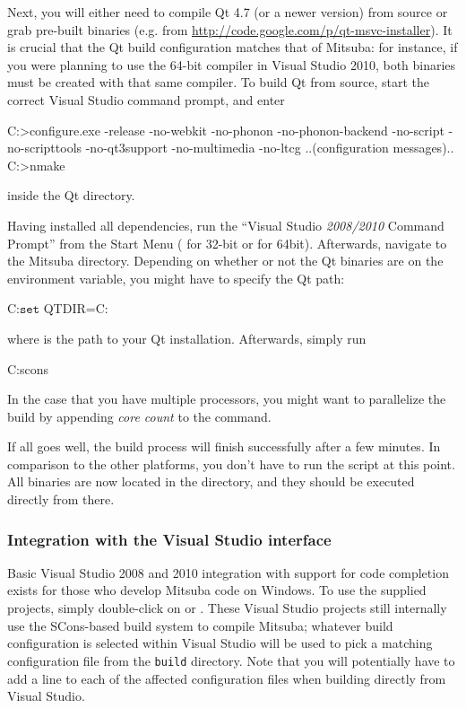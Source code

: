 Next, you will either need to compile Qt 4.7 (or a newer version) from source or grab pre-built binaries (e.g. from \url{http://code.google.com/p/qt-msvc-installer}). It is crucial that the Qt build configuration matches that of Mitsuba: for instance, if you were planning to use the 64-bit compiler in Visual Studio 2010, both binaries must be created with that same compiler.
To build Qt from source, start the correct Visual Studio command prompt, and enter
\begin{shell}
C:\Qt>configure.exe -release -no-webkit -no-phonon -no-phonon-backend -no-script
      -no-scripttools -no-qt3support -no-multimedia -no-ltcg
..(configuration messages)..
C:\Qt>nmake
\end{shell}
inside the Qt directory.

Having installed all dependencies, run the ``Visual Studio \emph{2008/2010} Command 
Prompt'' from the Start Menu ( for 32-bit or  for 64bit). Afterwards,
navigate to the Mitsuba directory.
Depending on whether or not the Qt binaries are on the 
environment variable, you might have to specify the Qt path:
\begin{shell}
C:\Mitsuba\>$\texttt{set}$ QTDIR=C:\Qt
\end{shell}
where  is the path to your Qt installation.
Afterwards, simply run
\begin{shell}
C:\Mitsuba\>scons
\end{shell}
In the case that you have multiple processors, you might want to parallelize the build by appending \emph{core count} to the  command.

If all goes well, the build process will finish successfully after a few
minutes. In comparison to the other platforms, you don't have to run the  script at this point. 
All binaries are now located in the  directory, and they should be executed directly from there.
\subsubsection{Integration with the Visual Studio interface}
Basic Visual Studio 2008 and 2010 integration with support for code completion 
exists for those who develop Mitsuba code on Windows. 
To use the supplied projects, simply double-click on  
or . These Visual Studio projects still internally
use the SCons-based build system to compile Mitsuba; whatever 
build configuration is selected within Visual Studio will be used to pick a matching
configuration file from the \texttt{build} directory. Note that you will
potentially have to add a  line to each of the
affected configuration files when building directly from Visual Studio.


